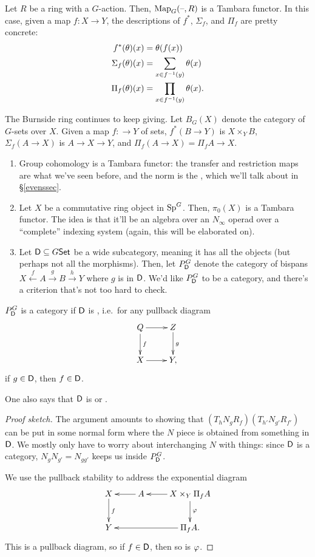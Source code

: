 \begin{exm}
Let $R$ be a ring with a $G$-action. Then, $\operatorname{Map}_G(\text{--},R)$ is a Tambara functor. In this case, given a map $f\colon
X\to Y$, the descriptions of $f^*$, $\Sigma_f$, and $\Pi_f$ are pretty concrete:
\begin{align*}
	f^*(\theta)(x) &= \theta(f(x))\\
	\Sigma_f(\theta)(x) &= \sum_{x\in f^{-1}(y)} \theta(x)\\
	\Pi_f(\theta)(x) &= \prod_{x\in f^{-1}(y)} \theta(x).\qedhere
\end{align*}
\end{exm}
\begin{exm}
The Burnside ring continues to keep giving. Let $B_G(X)$ denote the category of $G$-sets over $X$. Given a map
$f\colon \to Y$ of sets, $f^*(B\to Y)$ is $X\times_Y B$, $\Sigma_f(A\to X)$ is $A\to X\to Y$, and $\Pi_f(A\to X) =
\Pi_fA\to X$.
\end{exm}
\begin{exm}\hfill
\label{Evensexm}
\begin{enumerate}
	\item Group cohomology is a Tambara functor: the transfer and restriction maps are what we've seen before, and
	the norm is the , which we'll talk about in \S\ref{evenssec}.
	\item Let $X$ be a commutative ring object in $\mathrm{Sp}^G$. Then, $\pi_0(X)$ is a Tambara functor. The idea is that
	it'll be an algebra over an $N_\infty$ operad over a ``complete'' indexing system (again, this will be
	elaborated on).
	\item Let $\mathsf D\subseteq G\mathsf{Set}$ be a wide subcategory, meaning it has all the objects (but perhaps not all the
	morphisms). Then, let $P_\mathsf D^G$ denote the category of bispans $X\stackrel f\gets A\stackrel g\to B\stackrel
	h\to Y$ where $g$ is in $\mathsf D$. We'd like $P_\mathsf D^G$ to be a category, and there's a criterion that's not too
	hard to check.\qedhere
\end{enumerate}
\end{exm}
\begin{prop}
$P_\mathsf D^G$ is a category if $\mathsf D$ is , i.e.\ for any pullback diagram
\[\xymatrix{
	Q\ar[r]\ar[d]^f & Z\ar[d]^g\\
	X\ar[r] & Y,
}\]
if $g\in\mathsf D$, then $f\in\mathsf D$.
\end{prop}
One also says that $\mathsf D$ is  or .
\begin{proof}[Proof sketch]
The argument amounts to showing that $(T_h N_g R_f)(T_{h'}N_{g'}R_{f'})$ can be put in some normal form where the
$N$ piece is obtained from something in $\mathsf D$. We mostly only have to worry about interchanging $N$ with things:
since $\mathsf D$ is a category, $N_gN_{g'} = N_{gg'}$ keeps us inside $P_\mathsf D^G$.

We use the pullback stability to address the exponential diagram
\[\xymatrix{
	X\ar[d]^f & A\ar[l] & X\times_Y\Pi_fA\ar[d]^\vp\ar[l]\\
	Y && \Pi_f A.\ar[ll]
}\]
This is a pullback diagram, so if $f\in\mathsf D$, then so is $\varphi$.
\end{proof}
